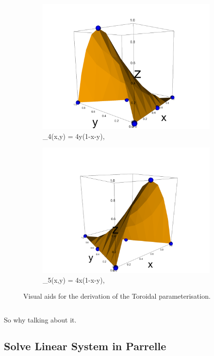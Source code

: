\documentclass[12pt,a4paper]{article}
\begin{document}
\begin{figure}[H]
\begin{subfigure}{0.5\textwidth}
     \includegraphics[width=\textwidth]{Pics/BasisFunc/triBasis4.png}
     \caption{\phi_4(x,y) = 4y(1-x-y),}
 \end{subfigure}
 \hfill
 \begin{subfigure}{0.5\textwidth}
     \includegraphics[width=\textwidth]{Pics/BasisFunc/triBasis5.png}
     \caption{\phi_5(x,y) = 4x(1-x-y),}
 \end{subfigure}
 \hfill
 \caption{Visual aids for the derivation of the Toroidal parameterisation.} \label{triBasisFuncs}
\end{figure}

\subsection{}
So why talking about it.

\subsection{Solve Linear System in Parrelle}
\end{document}
